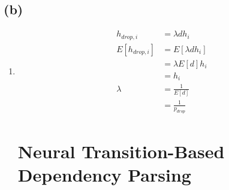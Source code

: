 \documentclass[11pt]{article}
\begin{document}
\subsection*{(b)}
\begin{enumerate}
  \item \begin{align*}
    h_{drop, i} &= \lambda d h_i\\
    E[h_{drop, i}] &= E[\lambda d h_i] \\
      &= \lambda E[d] h_i \\
      &= h_i \\
    \lambda &= \frac{1}{E[d]} \\
      &= \frac{1}{p_{drop}}
  \end{align*}

\section{Neural Transition-Based Dependency Parsing}

\end{enumerate}
\end{document}
